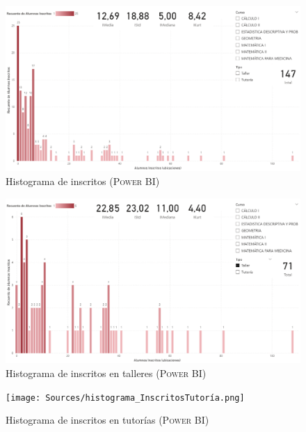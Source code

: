 \documentclass[11pt,a4paper]{book}
\theoremstyle{definition}%
\begin{document}
                    \begin{figure}[H]
                        \centering
                        \includegraphics[width=1\textwidth]{Sources/histograma_InscritosGlobal.png}
                        \caption{Histograma de inscritos (\textsc{Power BI})}
                        \label{fig:histograma_InscritosGlobal}
                    \end{figure}
                    \newpage
                    \begin{figure}[H]
                        \centering
                        \includegraphics[width=1\textwidth]{Sources/histograma_InscritosTaller.png}
                        \caption{Histograma de inscritos en talleres (\textsc{Power BI})}
                        \label{fig:histograma_InscritosTaller}
                    \end{figure}
                    \begin{figure}[H]
                        \centering
                        \texttt{[image: Sources/histograma\_InscritosTutoría.png]}
                        \caption{Histograma de inscritos en tutorías (\textsc{Power BI})}
                        \label{fig:histograma_InscritosTutoría}
                    \end{figure}
            \newpage
\end{document}
